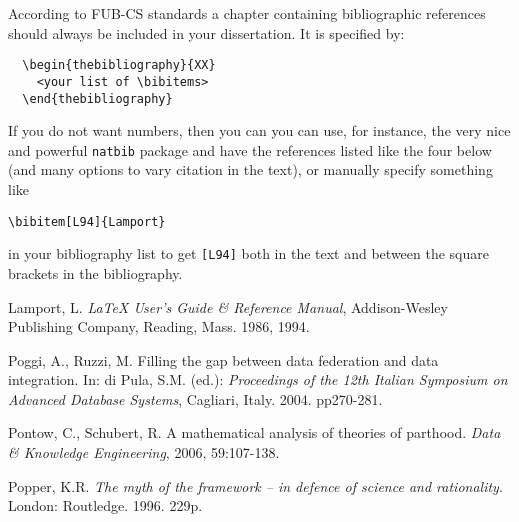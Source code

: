 \begin{thebibliography}{XX}
\small
{}
According to FUB-CS standards a chapter containing bibliographic
references should always be included in your dissertation.
It is specified by:
\begin{verbatim}
  \begin{thebibliography}{XX}
    <your list of \bibitems>
  \end{thebibliography}
\end{verbatim}

If you do not want numbers, then you can you can use, for instance, the very nice and powerful \texttt{natbib} package and have the references listed like the four below (and many options to vary citation in the text), or manually specify something like
\begin{verbatim}
\bibitem[L94]{Lamport}
\end{verbatim}
in your bibliography list to get \verb|[L94]| both in the text and between the square brackets in the bibliography. 

Lamport, L. {\em \LaTeX{} User's Guide \& Reference
Manual\/}, Addison-Wesley Publishing Company, Reading, Mass. 1986, 1994.

Poggi, A., Ruzzi, M. Filling the gap between data federation and data integration. In: di Pula, S.M. (ed.): \emph{Proceedings of the 12th Italian Symposium on Advanced Database Systems}, Cagliari, Italy. 2004. pp270-281.

	Pontow, C., Schubert, R. A mathematical analysis of theories of parthood. \emph{Data \& Knowledge Engineering}, 2006, 59:107-138.

	Popper, K.R. \emph{The myth of the framework -- in defence of science and rationality}. London: Routledge. 1996. 229p.

\end{thebibliography}


